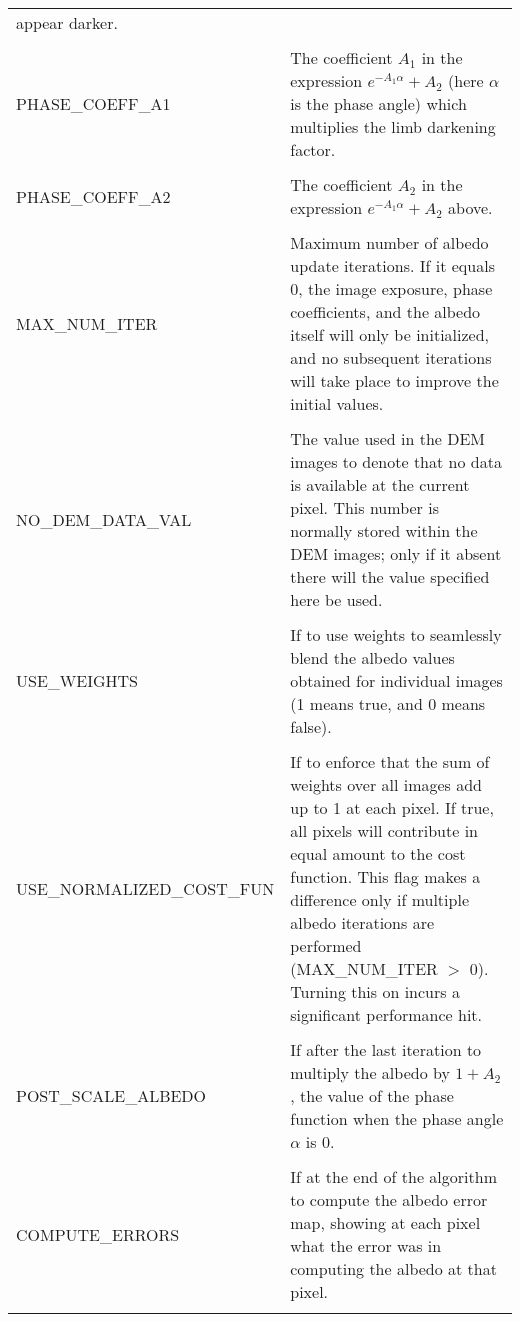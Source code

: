 \documentclass{article}
\begin{document}
\begin{longtable}{ l p{7cm} }
appear darker. \\
\\
PHASE\_COEFF\_A1  & The coefficient $A_1$ in the expression $e^{-A_1
  \alpha} + A_2$ (here $\alpha$ is the phase angle) which multiplies
the limb darkening factor.\\
\\
PHASE\_COEFF\_A2  & The coefficient $A_2$ in the expression $e^{-A_1 \alpha} + A_2$ above.\\
\\
MAX\_NUM\_ITER     &
Maximum number of albedo update iterations. If it equals 0, the image
exposure, phase coefficients, and the albedo itself will only be
initialized, and no subsequent iterations will take place to improve
the initial values.\\ 
\\
NO\_DEM\_DATA\_VAL &
The value used in the DEM images to denote that no data is available at the
current pixel. This number is normally stored within the DEM images;
only if it absent there will the value specified here be used.\\
\\
USE\_WEIGHTS &
 If to use weights to seamlessly blend the albedo values obtained for individual images (1 means true, and 0 means false).\\
\\
USE\_NORMALIZED\_COST\_FUN &
 If to enforce that the sum of weights over all images add up to 1 at
 each pixel.  If true, all pixels will contribute in equal amount to
 the cost function. This flag makes a difference only if multiple
 albedo iterations are performed (MAX\_NUM\_ITER $>$ 0). Turning this
 on incurs a significant performance hit.\\
\\
POST\_SCALE\_ALBEDO   &
 If after the last iteration to multiply the albedo by $1 + A_2$, the
 value of the phase function when the phase angle $\alpha$ is 0. \\
\\
COMPUTE\_ERRORS   &
 If at the end of the algorithm to compute the albedo error map, showing at each pixel what the error was in computing the albedo at that pixel.\\
\\

\end{longtable}
\end{document}
